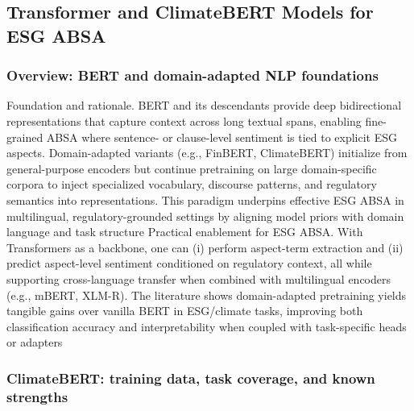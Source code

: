 \subsection{Transformer and ClimateBERT Models for ESG ABSA}

\subsubsection{Overview: BERT and domain-adapted NLP foundations}

Foundation and rationale. BERT and its descendants provide deep bidirectional representations that capture context across long textual spans, enabling fine-grained ABSA where sentence- or clause-level sentiment is tied to explicit ESG aspects. Domain-adapted variants (e.g., FinBERT, ClimateBERT) initialize from general-purpose encoders but continue pretraining on large domain-specific corpora to inject specialized vocabulary, discourse patterns, and regulatory semantics into representations. This paradigm underpins effective ESG ABSA in multilingual, regulatory-grounded settings by aligning model priors with domain language and task structure \cite{10.21608/msaeng.2023.291899,10.1108/ijaim-08-2023-0206,10.47473/2020rmm0103,10.18653/v1/2023.acl-short.91}
Practical enablement for ESG ABSA. With Transformers as a backbone, one can (i) perform aspect-term extraction and (ii) predict aspect-level sentiment conditioned on regulatory context, all while supporting cross-language transfer when combined with multilingual encoders (e.g., mBERT, XLM-R). The literature shows domain-adapted pretraining yields tangible gains over vanilla BERT in ESG/climate tasks, improving both classification accuracy and interpretability when coupled with task-specific heads or adapters \cite{10.21608/msaeng.2023.291899,10.18653/v1/2023.acl-short.91,10.1051/e3sconf/202343602004,10.48550/arxiv.2510.22964
}
\subsubsection{ClimateBERT: training data, task coverage, and known strengths}

